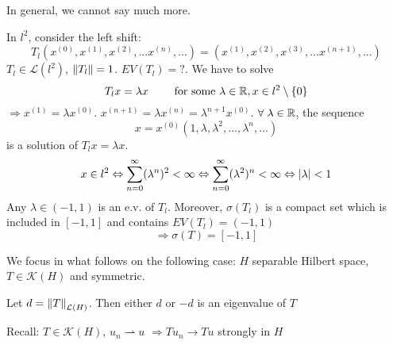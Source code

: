 In general, we cannot say much more.
\begin{example}
    
    In \(l^2\), consider the left shift:
    \[
        T_l(x^{(0)}, x^{(1)}, x^{(2)},... x^{(n)},...) = (x^{(1)}, x^{(2)}, x^{(3)},... x^{(n+1)},...)
    \]
    \(T_l \in \mathcal{L}(l^2)\), \(\norm{T_l}=1\). \(EV(T_l)=?\). We have to solve
    \[
        T_l x = \lambda x \qquad \text{ for some } \lambda \in \mathbb{R}, x \in l^2 \setminus \{0\}
    \]
    \(\Rightarrow x^{(1)}=\lambda x^{(0)}\). \(x^{(n+1)} = \lambda x^{(n)} = \lambda^{n+1} x^{(0)}\). \(\forall \; \lambda \in \mathbb{R}\), the sequence
    \[
        x = x^{(0)} \left(1, \lambda,\lambda^2, ..., \lambda^n, ...\right)
    \]
    is a solution of \(T_l x = \lambda x\).
    \[
        x \in l^2 \Leftrightarrow \sum_{n=0}^\infty (\lambda^n)^2 < \infty \Leftrightarrow \sum_{n=0}^\infty (\lambda^2)^n < \infty \Leftrightarrow \abs{\lambda} < 1
    \]
    Any \(\lambda \in (-1, 1)\) is an e.v. of \(T_l\). Moreover, \(\sigma(T_l)\) is a compact set which is included in \([-1, 1]\) and contains \(EV(T_l) =(-1, 1)\)
    \[
        \Rightarrow \sigma(T) = [-1, 1]
    \]
    
    
\end{example}
We focus in what follows on the following case: \(H\) separable Hilbert space, \(T \in \mathcal{K}(H)\) and symmetric.

\begin{proposition}
    Let \(d = \norm{T}_{\mathcal{L}(H)}\). Then either \(d\) or \(-d\) is an eigenvalue of \(T\)
\end{proposition}
Recall: \(T \in \mathcal{K}(H)\), \(u_n \rightharpoonup u\)  \(\Rightarrow T u_n \to Tu\) strongly in \(H\)

